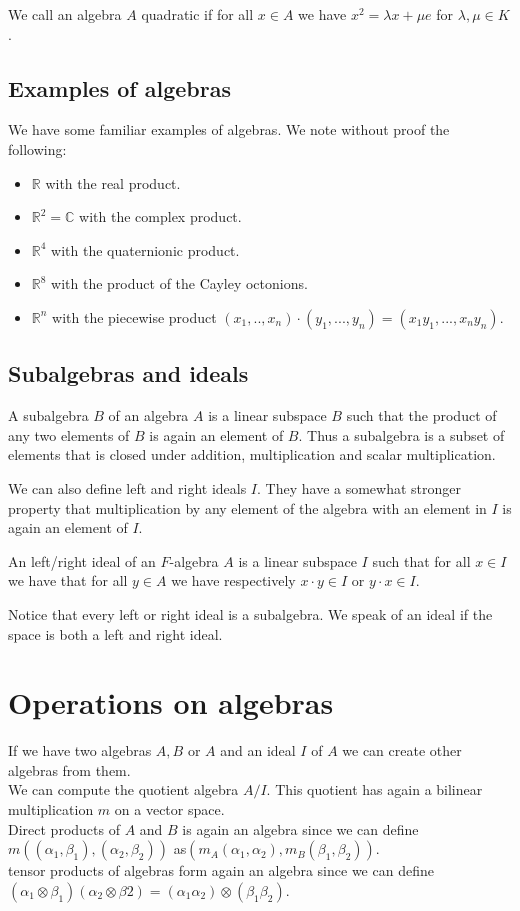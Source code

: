 \documentclass[../Thesis.tex]{subfiles}
\begin{document}
\begin{mydef}
We call an algebra $A$ quadratic if for all $x \in A$ we have $x^2 = \lambda x + \mu e$ for $\lambda , \mu \in K$.
\end{mydef}
\subsection{Examples of algebras}
We have some familiar examples of algebras. We note without proof the following:
\begin{itemize}
\item $\mathbb{R}$ with the real product.
\item $\mathbb{R}^2 = \mathbb{C}$ with the complex product.
\item $\mathbb{R}^ 4$ with the quaternionic product.
\item $\mathbb{R}^ 8$ with the product of the Cayley octonions.
\item $\mathbb{R}^n$ with the piecewise product $(x_1,..,x_n) \cdot (y_1,...,y_n) = (x_1y_1,...,x_ny_n)$.
\end{itemize}

\subsection{Subalgebras and ideals}
\begin{mydef}
A subalgebra $B$ of an algebra $A$ is a linear subspace $B$ such that the product of any two elements of $B$ is again an element of $B$. Thus a subalgebra is a subset of elements that is closed under addition, multiplication and scalar multiplication.
\end{mydef}
We can also define left and right ideals $I$. They have a somewhat stronger property that multiplication by any element of the algebra with an element in $I$ is again an element of $I$.
\begin{mydef}
An left/right ideal of an $F$-algebra $A$ is a linear subspace $I$ such that for all $x \in I$ we have that for all $y \in A$ we have respectively $x\cdot y \in I$ or $y \cdot x \in I$.
\end{mydef}
Notice that every left or right ideal is a subalgebra. We speak of an ideal if the space is both a left and right ideal.
\section{Operations on algebras}
If we have two algebras $A,B$ or $A$ and an ideal $I$ of $A$ we can create other algebras from them.
\\We can compute the quotient algebra $A/I$. This quotient has again a bilinear multiplication $m$ on a vector space.
\\Direct products of $A$ and $B$ is again an algebra since we can define $m((\alpha_1,\beta_1), (\alpha_2,\beta_2))$  as$ (m_A(\alpha_1,\alpha_2), m_B(\beta_1, \beta_2))$.
\\tensor products of algebras form again an algebra since we can define $(\alpha_1 \otimes \beta_1)(\alpha_2 \otimes \beta2) = (\alpha_1\alpha_2) \otimes (\beta_1\beta_2)$.
\end{document}
